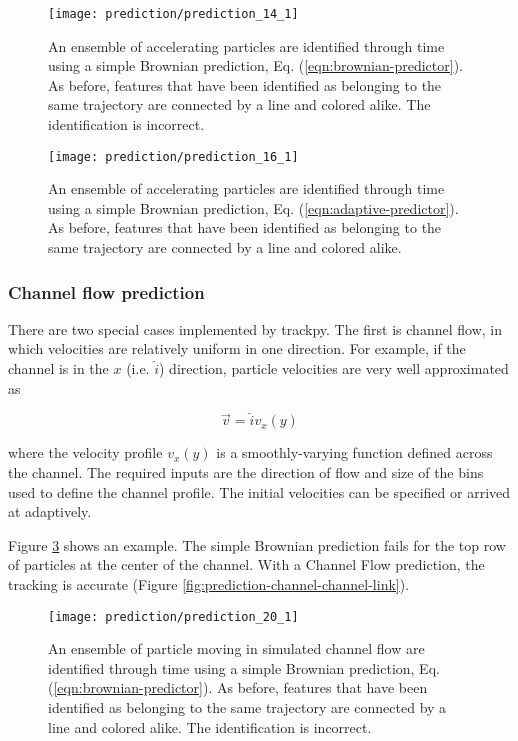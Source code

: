    \begin{figure}
    \centering
    \texttt{[image: prediction/prediction\_14\_1]}
    \caption{\label{fig:prediction-acceleration-brownian-link}An ensemble of accelerating particles are identified through time using a simple Brownian prediction, Eq. (\ref{eqn:brownian-predictor}). As before, features that have been identified as belonging to the same trajectory are connected by a line and colored alike. The identification is incorrect.}
    \end{figure}
   

   \begin{figure}
    \centering
    \texttt{[image: prediction/prediction\_16\_1]}
    \caption{\label{fig:prediction-acceleration-adaptive-link}An ensemble of accelerating particles are identified through time using a simple Brownian prediction, Eq. (\ref{eqn:adaptive-predictor}). As before, features that have been identified as belonging to the same trajectory are connected by a line and colored alike. }
    \end{figure}


    \subsubsection{Channel flow prediction}\label{channel-flow-prediction}

There are two special cases implemented by trackpy. The first is channel flow, in which velocities are relatively uniform in one
direction. For example, if the channel is in the $x$ (i.e. $\hat i$)
direction, particle velocities are very well approximated as

\begin{equation}
\vec v = \hat i v_x(y)
\end{equation}

\noindent where the velocity profile $v_x(y)$ is a smoothly-varying function
defined across the channel. The required inputs are the direction of flow and size of the bins used to
define the channel profile. The initial velocities can be specified or arrived at adaptively.

Figure \ref{fig:prediction-channel-brownian-link} shows an example. The simple Brownian prediction fails for the top row of particles at the center of the channel. With a Channel Flow prediction, the tracking is accurate (Figure \ref{fig:prediction-channel-channel-link}).

   \begin{figure}
    \centering
    \texttt{[image: prediction/prediction\_20\_1]}
    \caption{\label{fig:prediction-channel-brownian-link}An ensemble of particle moving in simulated channel flow are identified through time using a simple Brownian prediction, Eq. (\ref{eqn:brownian-predictor}). As before, features that have been identified as belonging to the same trajectory are connected by a line and colored alike. The identification is incorrect.}
    \end{figure}


